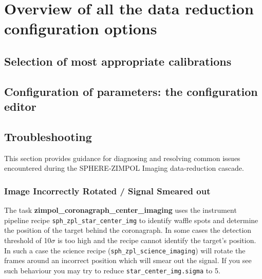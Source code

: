 \section{Overview of all the data reduction configuration options}
\label{sec:configuration_overview}

\subsection{Selection of most appropriate calibrations}



\subsection{Configuration of parameters: the configuration editor}
\label{sec:configuration_editor}


\subsection{Troubleshooting}

This section provides guidance for diagnosing and resolving common issues encountered during the SPHERE-ZIMPOL Imaging data-reduction cascade.


\subsubsection{Image Incorrectly Rotated / Signal Smeared out}

The task \textbf{zimpol\_coronagraph\_center\_imaging} uses the instrument pipeline recipe \texttt{sph\_zpl\_star\_center\_img}
to identify waffle spots and determine the position of the target behind the coronagraph.
In some cases the detection threshold of 10$\sigma$ is too high and the recipe cannot identify
the target’s position. In such a case the science recipe (\texttt{sph\_zpl\_science\_imaging})
will rotate the frames around an incorrect position which will smear out the signal.
If you see such behaviour you may try to reduce \texttt{star\_center\_img.sigma} to 5.
